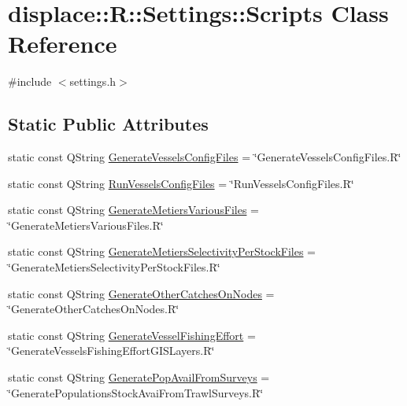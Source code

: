 \hypertarget{classdisplace_1_1_r_1_1_settings_1_1_scripts}{}\section{displace\+::R\+::Settings\+::Scripts Class Reference}
\label{classdisplace_1_1_r_1_1_settings_1_1_scripts}


{\ttfamily \#include $<$settings.\+h$>$}

\subsection*{Static Public Attributes}
\begin{DoxyCompactItemize}
\item 
static const Q\+String \mbox{\hyperlink{classdisplace_1_1_r_1_1_settings_1_1_scripts_a0493f5abb755be663e3a5c8705b2b21e}{Generate\+Vessels\+Config\+Files}} = \char`\"{}Generate\+Vessels\+Config\+Files.\+R\char`\"{}
\item 
static const Q\+String \mbox{\hyperlink{classdisplace_1_1_r_1_1_settings_1_1_scripts_a3188be88653e460d41a7bb7d238005b6}{Run\+Vessels\+Config\+Files}} = \char`\"{}Run\+Vessels\+Config\+Files.\+R\char`\"{}
\item 
static const Q\+String \mbox{\hyperlink{classdisplace_1_1_r_1_1_settings_1_1_scripts_afa66ed626b92e9b0f98c8baab74a1f98}{Generate\+Metiers\+Various\+Files}} = \char`\"{}Generate\+Metiers\+Various\+Files.\+R\char`\"{}
\item 
static const Q\+String \mbox{\hyperlink{classdisplace_1_1_r_1_1_settings_1_1_scripts_ae077c8b77b3de2ec32b0a82b5a06cc9c}{Generate\+Metiers\+Selectivity\+Per\+Stock\+Files}} = \char`\"{}Generate\+Metiers\+Selectivity\+Per\+Stock\+Files.\+R\char`\"{}
\item 
static const Q\+String \mbox{\hyperlink{classdisplace_1_1_r_1_1_settings_1_1_scripts_adc08f8c6acd0f11dc1a3b7dd8e5f14eb}{Generate\+Other\+Catches\+On\+Nodes}} = \char`\"{}Generate\+Other\+Catches\+On\+Nodes.\+R\char`\"{}
\item 
static const Q\+String \mbox{\hyperlink{classdisplace_1_1_r_1_1_settings_1_1_scripts_aa6b169af0ca26ea5f1180644bdfb0fd1}{Generate\+Vessel\+Fishing\+Effort}} = \char`\"{}Generate\+Vessels\+Fishing\+Effort\+G\+I\+S\+Layers.\+R\char`\"{}
\item 
static const Q\+String \mbox{\hyperlink{classdisplace_1_1_r_1_1_settings_1_1_scripts_a25e89b5c6c4c618c5fdb6b1de3c950e9}{Generate\+Pop\+Avail\+From\+Surveys}} = \char`\"{}Generate\+Populations\+Stock\+Avai\+From\+Trawl\+Surveys.\+R\char`\"{}

\end{DoxyCompactItemize}
